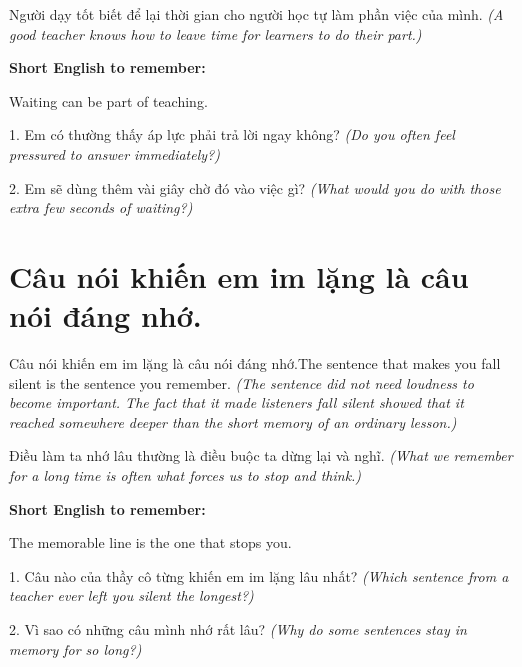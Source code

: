 \begin{baihoc}
Người dạy tốt biết để lại thời gian cho người học tự làm phần việc của mình.
\textit{(A good teacher knows how to leave time for learners to do their part.)}
\end{baihoc}

\begin{ghinhoanh}
\textbf{Short English to remember:}

Waiting can be part of teaching.

\end{ghinhoanh}

\begin{tuhocnhanh}
1. Em có thường thấy áp lực phải trả lời ngay không? \textit{(Do you often feel pressured to answer immediately?)}

2. Em sẽ dùng thêm vài giây chờ đó vào việc gì? \textit{(What would you do with those extra few seconds of waiting?)}
\end{tuhocnhanh}
\ngancach


\section{Câu nói khiến em im lặng là câu nói đáng nhớ.}
\begin{truyen}{Câu nói khiến em im lặng là câu nói đáng nhớ.}{The sentence that makes you fall silent is the sentence you remember.}
\textit{(The sentence did not need loudness to become important. The fact that it made listeners fall silent showed that it reached somewhere deeper than the short memory of an ordinary lesson.)}
\end{truyen}

\begin{baihoc}
Điều làm ta nhớ lâu thường là điều buộc ta dừng lại và nghĩ.
\textit{(What we remember for a long time is often what forces us to stop and think.)}
\end{baihoc}

\begin{ghinhoanh}
\textbf{Short English to remember:}

The memorable line is the one that stops you.

\end{ghinhoanh}

\begin{tuhocnhanh}
1. Câu nào của thầy cô từng khiến em im lặng lâu nhất? \textit{(Which sentence from a teacher ever left you silent the longest?)}

2. Vì sao có những câu mình nhớ rất lâu? \textit{(Why do some sentences stay in memory for so long?)}
\end{tuhocnhanh}
\ngancach


